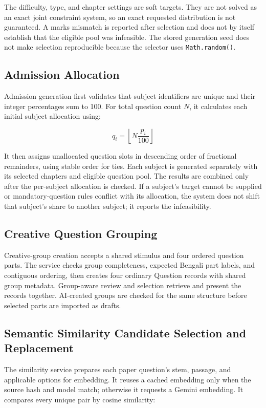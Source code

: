 The difficulty, type, and chapter settings are soft targets. They are not solved as an exact joint constraint system, so an exact requested distribution is not guaranteed. A marks mismatch is reported after selection and does not by itself establish that the eligible pool was infeasible. The stored generation seed does not make selection reproducible because the selector uses \texttt{Math.random()}.

\subsection{Admission Allocation}

Admission generation first validates that subject identifiers are unique and their integer percentages sum to 100. For total question count \(N\), it calculates each initial subject allocation using:

\[
q_i = \left\lfloor N \frac{p_i}{100} \right\rfloor
\]

It then assigns unallocated question slots in descending order of fractional remainders, using stable order for ties. Each subject is generated separately with its selected chapters and eligible question pool. The results are combined only after the per-subject allocation is checked. If a subject's target cannot be supplied or mandatory-question rules conflict with its allocation, the system does not shift that subject's share to another subject; it reports the infeasibility.

\subsection{Creative Question Grouping}

Creative-group creation accepts a shared stimulus and four ordered question parts. The service checks group completeness, expected Bengali part labels, and contiguous ordering, then creates four ordinary Question records with shared group metadata. Group-aware review and selection retrieve and present the records together. AI-created groups are checked for the same structure before selected parts are imported as drafts.

\subsection{Semantic Similarity Candidate Selection and Replacement}

The similarity service prepares each paper question's stem, passage, and applicable options for embedding. It reuses a cached embedding only when the source hash and model match; otherwise it requests a Gemini embedding. It compares every unique pair by cosine similarity:

